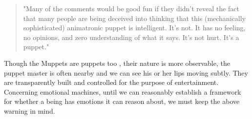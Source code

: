 \begin{quote}
"Many of the comments would be good fun if they didn’t reveal the fact that many people are being deceived into thinking that this (mechanically sophisticated) animatronic puppet is intelligent. It’s not. It has no feeling, no opinions, and zero understanding of what it says. It’s not hurt. It’s a puppet." \cite{sofia}
\end{quote}

Though the Muppets are puppets too \cite{muppets}, their nature is more observable, the puppet master is often nearby and we can see his or her lips moving subtly. They are transparently built and controlled for the purpose of entertainment. Concerning emotional machines, until we can reasonably establish a framework for whether a being has emotions it can reason about, we must keep the above warning in mind.